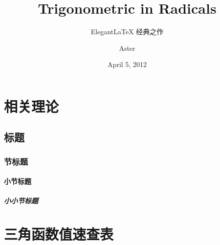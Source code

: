 \documentclass[lang=cn,10pt]{elegantbook}
\title{Trigonometric in Radicals}
\subtitle{Elegant\LaTeX{} 经典之作}
\author{Aster}
\date{April 5, 2012}
\begin{document}
\maketitle
\frontmatter

\tableofcontents

\mainmatter

\part{相关理论}\label{part:introduce}

\chapter{标题}
\section{节标题}
\subsection{小节标题}
\subsubsection{小小节标题}

\part{三角函数值速查表}\label{part:trig}
\setcounter{chapter}{0}








\end{document}
